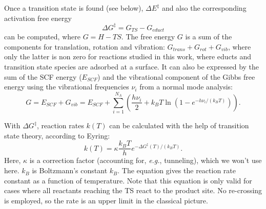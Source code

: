 \documentclass[11pt,DIV=13,BCOR=5mm,a4paper,headinclude]{scrbook}
\begin{document}
Once a transition state is found (see below), $\Delta E^\ddagger$ and also the corresponding activation free energy
\begin{equation}
\Delta G^\ddagger = G_{TS} - G_{educt}
\end{equation}
can be computed, where $G=H-TS$. %
The free energy $G$ is a sum of the components for translation, rotation and vibration: $G_{trans}+G_{rot}+G_{vib}$, where only the latter is non zero for reactions studied in this work, where educts and transition state species are adsorbed at a surface.
It can also be expressed by the sum of the SCF energy ($E_{SCF}$) and the vibrational component of the Gibbs free energy using the vibrational frequencies $\nu_i$ from a normal mode analysis:
\begin{equation}
G=E_{SCF} + G_{vib}=E_{SCF}+ \sum_{i=1}^{N_A}(\frac{h\nu_i}{2} + k_BT\ln(1-e^{-h\nu_i/(k_BT)})).
\end{equation}

With $\Delta G^\ddagger$, reaction rates $k(T)$ can be calculated with the help of transition state theory, according to Eyring\cite{eyring,eyring-polanyi}:
\begin{equation}\label{eq:eyring}
k(T)=\kappa\frac{k_BT}{h}e^{-\Delta G^\ddagger(T)/(k_BT)}.
\end{equation}
Here, $\kappa$ is a correction factor (accounting for, \textit{e.g.}, tunneling), which we won't use here. $k_B$ is Boltzmann's constant $k_B$.
The equation gives the reaction rate constant as a function of temperature.
Note that this equation is only valid for cases where all reactants reaching the TS react to the product site.
No re-crossing is employed, so the rate is an upper limit in the classical picture.
\\\\
\end{document}
